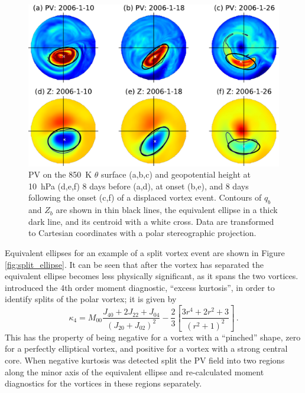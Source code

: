 \begin{figure}
 \centering
 \noindent\includegraphics[width=\textwidth]{figures/chapter-moments/PV_GPH_2006.pdf}
 \caption[Equivalent ellipse for a displaced vortex event.]{PV on the 850~K
   $\theta$ surface (a,b,c) and geopotential height at 10~hPa (d,e,f) 8 days
   before (a,d), at onset (b,e), and 8 days following the onset (c,f) of a
   displaced vortex event. Contours of $q_{b}$ and $Z_{b}$ are shown in thin
   black lines, the equivalent ellipse in a thick dark line, and its centroid
   with a white cross. Data are transformed to Cartesian coordinates with a
   polar stereographic projection.}
 \label{fig:displaced_ellipse}
\end{figure}

Equivalent ellipses for an example of a split vortex event are shown in Figure
\ref{fig:split_ellipse}. It can be seen that after the vortex has separated the
equivalent ellipse becomes less physically significant, as it spans the two
vortices. \citet{Matthewman2009} introduced the 4th order moment diagnostic,
``excess kurtosis'', in order to identify splits of the polar vortex; it is
given by
\begin{equation}
\kappa_4 = M_{00}\frac{J_{40}+2J_{22}+J_{04}}{(J_{20}+J_{02})^2}-\frac{2}{3}\left[\frac{3r^4+2r^2+3}{(r^2+1)^2}\right]\,.
\end{equation}
This has the property of being negative for a vortex with a ``pinched'' shape,
zero for a perfectly elliptical vortex, and positive for a vortex with a strong
central core. When negative kurtosis was detected \citet{Matthewman2009} split
the PV field into two regions along the minor axis of the equivalent ellipse and
re-calculated moment diagnostics for the vortices in these regions separately. 


